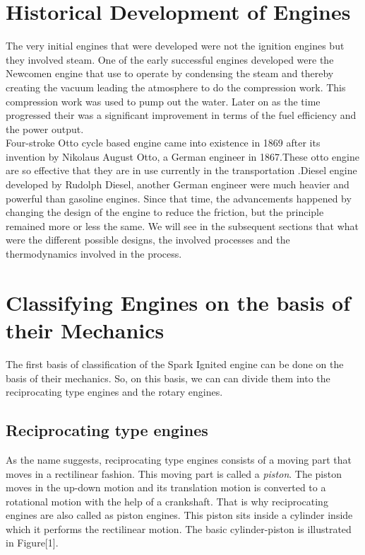 \documentclass[11pt]{article}
\begin{document}
\section{Historical Development of Engines}
The very initial engines that were developed were not the ignition engines but they involved steam. One of the early successful engines developed were the Newcomen engine that use to operate by condensing the steam and thereby creating the vacuum leading the atmosphere to do the compression work. This compression work was used to pump out the water. Later on as the time progressed their was a significant improvement in terms of the fuel efficiency and the power output. \cite{ref15}\\
 Four-stroke Otto cycle based engine came into existence in 1869 after its invention by Nikolaus August Otto, a German engineer in 1867.These otto engine are so effective that they are in use currently in the transportation .Diesel engine developed by Rudolph Diesel, another German engineer were much heavier and powerful than gasoline engines. Since that time, the advancements happened by changing the design of the engine to reduce the friction, but the principle remained more or less the same. We will see in the subsequent sections that what were the different possible designs, the involved processes and the thermodynamics involved in the process.
\section{Classifying Engines on the basis of their Mechanics}
\begin{flushleft}
The first basis of classification of the Spark Ignited engine can be done on the basis of their mechanics. So, on this basis, we can can divide them into the reciprocating type engines and the rotary engines.
\end{flushleft}
\subsection{Reciprocating type engines}
As the name suggests, reciprocating type engines consists of a moving part that moves in a rectilinear fashion. This moving part is called a \textit{piston}. The piston moves in the up-down motion and its translation motion is converted to a rotational motion with the help of a crankshaft. That is why reciprocating engines are also called as piston engines. This piston sits inside a cylinder inside which it performs the rectilinear motion. The basic cylinder-piston is illustrated in Figure[1]. \\
\end{document}
